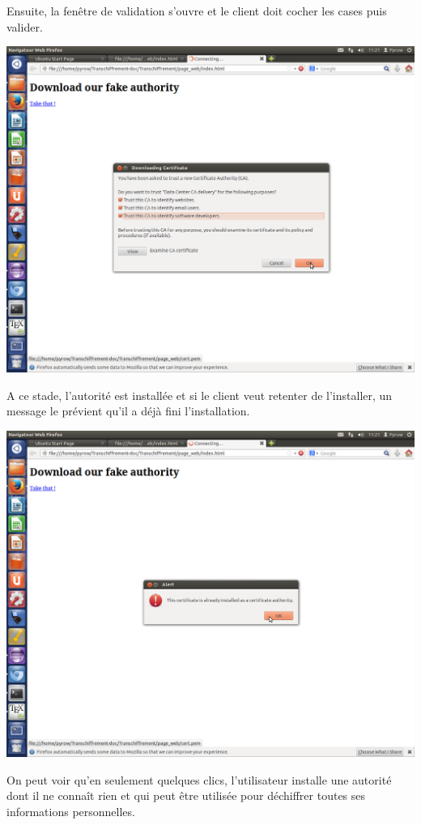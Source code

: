 Ensuite, la fenêtre de validation s'ouvre et le client doit cocher les cases puis valider.

\includegraphics[width=\textwidth]{images_autorites/Cert.png} 
\newpage

A ce stade, l'autorité est installée et si le client veut retenter de l'installer, un message le prévient qu'il a déjà fini l'installation.

\includegraphics[width=\textwidth]{images_autorites/Alerte.png}

On peut voir qu'en seulement quelques clics, l'utilisateur installe une autorité dont il ne connaît rien et qui peut être utilisée pour déchiffrer toutes ses informations personnelles. 